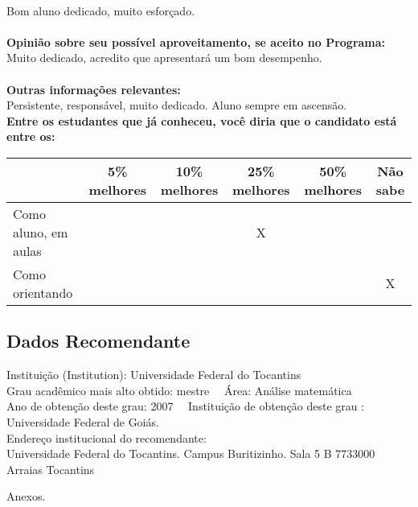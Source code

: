 \documentclass[11pt]{article}
\begin{document}
\\Bom aluno dedicado, muito esforçado.\\
\\
\textbf{Opinião sobre seu possível aproveitamento, se aceito no Programa:}
\\Muito dedicado, acredito que apresentará um bom desempenho.\\ 
\\
\textbf{Outras informações relevantes:} \\Persistente, responsável, muito dedicado. Aluno sempre em ascensão. 
\\[0.3cm]
\textbf{Entre os estudantes que já conheceu, você diria que o candidato está entre os:}
\\
\begin{tabular}{|l|c|c|c|c|c|}
\hline
 & 5\% melhores & 10\% melhores & 25\% melhores & 50\% melhores & Não sabe \\
\hline
Como aluno, em aulas &  &  & X &  & \\
\hline
Como orientando &  &  &  &  & X\\
\hline
\end{tabular}
\subsection*{Dados Recomendante} 
	Instituição (Institution): Universidade Federal do Tocantins
\\ 
	Grau acadêmico mais alto obtido: mestre
	\ \ Área: Análise matemática
	\\
	Ano de obtenção deste grau: 2007
	\ \ 
	Instituição de obtenção deste grau : Universidade Federal de Goiás.
	\\ 
	Endereço institucional do recomendante: \\ Universidade Federal do Tocantins.
Campus Buritizinho. Sala 5  B
7733000 Arraias Tocantins 
\begin{center}
Anexos.
\end{center}
\end{document}

